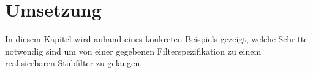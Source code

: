 \section{Umsetzung}

In diesem Kapitel wird anhand eines konkreten Beispiels gezeigt, welche Schritte notwendig sind um von einer gegebenen Filterspezifikation zu einem realisierbaren Stubfilter zu gelangen. 






